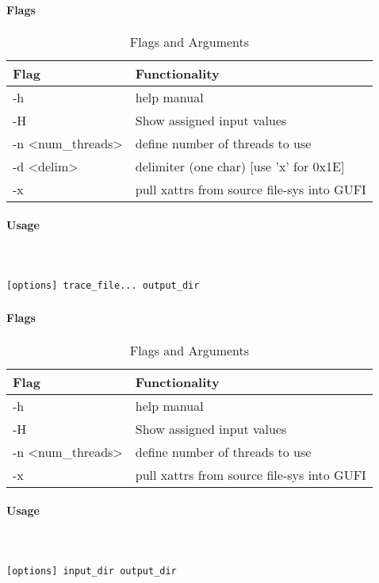 \paragraph{Flags}
\begin{table} [H]
  \centering
  \begin{tabular}{l|l}
    Flag & Functionality \\
    \hline
    -h & help manual \\
    \hline
    -H & Show assigned input values \\
    \hline
    -n \textless num\_threads\textgreater & define number of threads to use \\
    \hline
    -d \textless delim\textgreater & delimiter (one char)  [use 'x' for 0x1E] \\
    \hline
    -x & pull xattrs from source file-sys into GUFI \\
    \hline
  \end{tabular}
  \caption{\gufitracedir Flags and Arguments}
\end{table}

\paragraph{Usage} ~\\\\
\gufitracedir \texttt{[options] trace\_file... output\_dir}

\subsubsection{\gufiindexdir}
\paragraph{Flags}
\begin{table} [H]
  \centering
  \begin{tabular}{l|l}
    Flag & Functionality \\
    \hline
    -h & help manual \\
    \hline
    -H & Show assigned input values \\
    \hline
    -n \textless num\_threads\textgreater & define number of threads to use \\
    \hline
    -x & pull xattrs from source file-sys into GUFI \\
    \hline
  \end{tabular}
  \caption{\gufiindexdir Flags and Arguments}
\end{table}

\paragraph{Usage} ~\\\\
\gufiindexdir \texttt{[options] input\_dir output\_dir}
